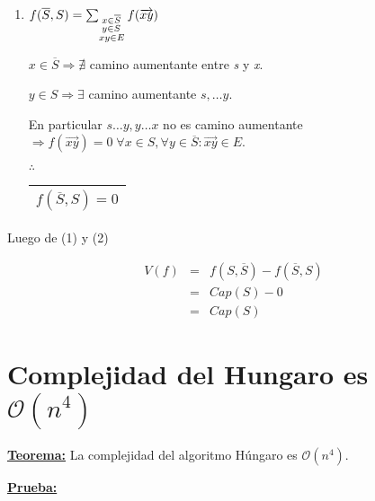 \documentclass[12pt,a4paper]{report}
\begin{document}
\begin{enumerate}[(1)]
				\item $f(\overline{S}, S) = \sum_{\begin{subarray}{l} \; x \in \overline{S}\\
\; y \in S \\ xy \in E\end{subarray}} f(\overrightarrow{xy}) $

				$x \in \overline{S} \Rightarrow \nexists$ camino aumentante entre \textit{s} y \textit{x}.

				$y \in S \Rightarrow \exists$ camino aumentante $ s, \dotsc y$.

				En particular $s \dotsc y, y \dotsc x$ no es camino aumentante $\Rightarrow f(\overrightarrow{xy}) = 0  \; \forall x \in S, \forall y \in \overline{S} : \overrightarrow{xy} \in E$.

				\vspace{3mm}
				$\therefore$ \begin{tabular}{|c|} \hline $ f(\overline{S}, S) = 0 $ \\ \hline \end{tabular}
			\end{enumerate}

			Luego de (1) y (2)

			\begin{eqnarray}
				\nonumber V(f) &=& f(S, \overline{S}) - f(\overline{S}, S)\\
				\nonumber &=& Cap(S) - 0 \\
				\nonumber &=& Cap(S)
			\end{eqnarray}

	\section{Complejidad del Hungaro es $\mathcal{O}(n^{4})$}

		\textbf{\underline{Teorema:}} La complejidad del algoritmo Húngaro es $\mathcal{O}(n^{4})$.

		\textbf{\underline{Prueba:}}
\end{document}
